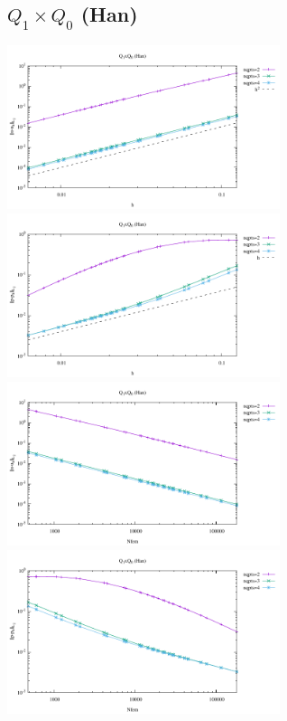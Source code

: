 \subsection*{$Q_1\times Q_0$ (Han)}
\begin{center}
\includegraphics[width=8cm]{python_codes/fieldstone_120/results/HanQ0-velocity-h.pdf}
\includegraphics[width=8cm]{python_codes/fieldstone_120/results/HanQ0-pressure-h.pdf}
\includegraphics[width=8cm]{python_codes/fieldstone_120/results/HanQ0-velocity-Nfem.pdf}
\includegraphics[width=8cm]{python_codes/fieldstone_120/results/HanQ0-pressure-Nfem.pdf}
\end{center}


